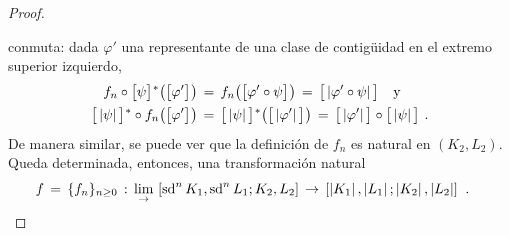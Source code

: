 \begin{proof}
\begin{center}
	\end{center}
	conmuta: dada $\varphi'$ una representante de una clase de
	contig\"{u}idad en el extremo superior izquierdo,
	\begin{align*}
		f_{n}\circ\clase{\psi}^{*}\big(\clase{\varphi'}\big) & \,=\,
			f_{n}\big(\clase{\varphi'\circ\psi}\big) \,=\,
			\clase{\geom{\varphi'\circ\psi}}
		\quad\text{y} \\
		\clase{\geom{\psi}}^{*}\circ f_{n}\big(\clase{\varphi'}\big)
			& \,=\,\clase{\geom{\psi}}^{*}
				\big(\clase{\geom{\varphi'}}\big) \,=\,
			\clase{\geom{\varphi'}}\circ\clase{\geom{\psi}}
		\text{ .}
	\end{align*}
	De manera similar, se puede ver que la definici\'{o}n de $f_{n}$ es
	natural en $(K_{2},L_{2})$. Queda determinada, entonces, una
	transformaci\'{o}n natural
	\begin{align*}
		f & \,=\, \{f_{n}\}_{n\geq 0} \,:\,
			\lim_{\to}\,
			\contiguas{\subdiv[n]{K_{1}},\subdiv[n]{L_{1}}}%
				{K_{2},L_{2}} \,\rightarrow\,
			\homotopicas{\geom{K_{1}},\geom{L_{1}}}%
				{\geom{K_{2}},\geom{L_{2}}}
		\text{ .}
	\end{align*}


\end{proof}
